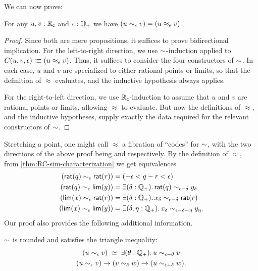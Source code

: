 We can now prove:

\begin{thm}\label{thm:RC-sim-characterization}
  For any $u,v:\mathbb{R}_\mathsf{c}$ and $\epsilon:\mathbb{Q}_{+}$ we have $(u\sim_{\epsilon} v) = (u\approx_\epsilon v)$.
\end{thm}
\begin{proof}
  Since both are mere propositions, it suffices to prove bidirectional implication.
  For the left-to-right direction, we use $\mathord\sim$-induction applied to $C(u,v,\epsilon)\vcentcolon\equiv (u\approx_\epsilon v)$.
  Thus, it suffices to consider the four constructors of $\mathord\sim$.
  In each case, $u$ and $v$ are specialized to either rational points or limits, so that the definition of $\approx$ evaluates, and the inductive hypothesis always applies.

  For the right-to-left direction, we use $\mathbb{R}_\mathsf{c}$-induction to assume that $u$ and $v$ are rational points or limits, allowing $\approx$ to evaluate.
  But now the definitions of $\approx$, and the inductive hypotheses, supply exactly the data required for the relevant constructors of $\mathord\sim$.
\end{proof}

%
Stretching a point, one might call $\approx$ a fibration of ``codes'' for $\mathord\sim$, with the two directions of the above proof being \encode and \decode respectively.
By the definition of $\approx$, from \cref{thm:RC-sim-characterization} we get equivalences
\begin{align*}
  (\rcrat(q) \close\epsilon \rcrat(r))  &=
  (-\epsilon < q - r < \epsilon)\\
  (\rcrat(q) \close\epsilon \rclim(y)) &=
  \exis{\delta : \Qp} \rcrat(q) \close{\epsilon - \delta} y_\delta\\
  (\rclim(x) \close\epsilon \rcrat(r)) &=
  \exis{\delta : \Qp} x_\delta \close{\epsilon - \delta} \rcrat(r)\\
  (\rclim(x) \close\epsilon \rclim(y)) &=
  \exis{\delta, \eta : \Qp} x_\delta \close{\epsilon - \delta - \eta} y_\eta.
\end{align*}
Our proof also provides the following additional information.

\begin{cor}
  $\mathord\sim$ is rounded and satisfies the triangle inequality:
    \begin{gather}
      \eqvspaced{
        (u \close\epsilon v)
      }{
        \exis{\theta : \Qp} u \close{\epsilon - \theta} v
      }\\
      (u\close\epsilon v) \to (v\close\delta w) \to (u\close{\epsilon+\delta} w). \label{item:RC-sim-triangle}
    \end{gather}
\end{cor}


